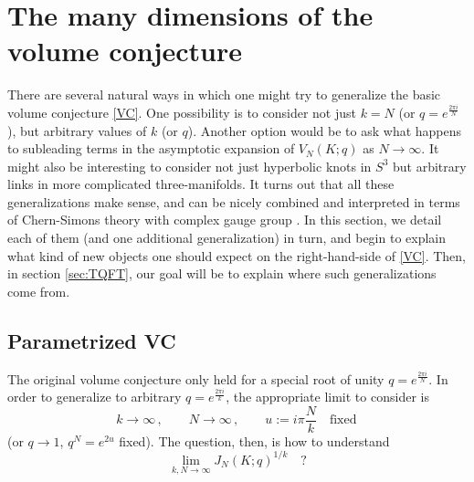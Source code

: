 \documentclass[letterpaper,12pt]{article}
\numberwithin{equation}{section}
\newcommand{\be}{\begin{equation}}
\newcommand{\ee}{\end{equation}}
\renewcommand{\=}{\;=\;}
\begin{document}

\section{The many dimensions of the volume conjecture}
\label{sec:gen}

There are several natural ways in which one might try to generalize the basic volume conjecture \eqref{VC}.
One possibility is to consider not just $k=N$ (or $q=e^{\frac{2\pi i}{N}}$), but arbitrary values of $k$ (or $q$).
Another option would be to ask what happens to subleading terms in the asymptotic expansion of $V_N(K;q)$ as $N\to\infty$.
It might also be interesting to consider not just hyperbolic knots in $S^3$
but arbitrary links in more complicated three-manifolds.
It turns out that all these generalizations make sense,
and can be nicely combined and interpreted in terms of Chern-Simons theory with complex gauge group \cite{gukov-2003}.
In this section, we detail each of them (and one additional generalization) in turn,
and begin to explain what kind of new objects one should expect on the right-hand-side of \eqref{VC}.
Then, in section \ref{sec:TQFT}, our goal will be to explain where such generalizations come from.

\subsection{Parametrized VC}

The original volume conjecture only held for a special root of unity $q = e^{\frac{2\pi i}{N}}$.
In order to generalize to arbitrary $q=e^{\frac{2\pi i}{k}}$, the appropriate limit to consider is
%
\be k\to\infty\,,\qquad N\to\infty\,,\qquad u := i\pi\frac { N} k \quad\text{fixed}\, \label{lim} \ee
%
(or $q\to 1$,\; $q^N = e^{2u}$ fixed). The question, then, is how to understand
%
\be \lim_{k,N\to\infty} J_N(K;q)^{1/k}\quad ? \ee
\end{document}
